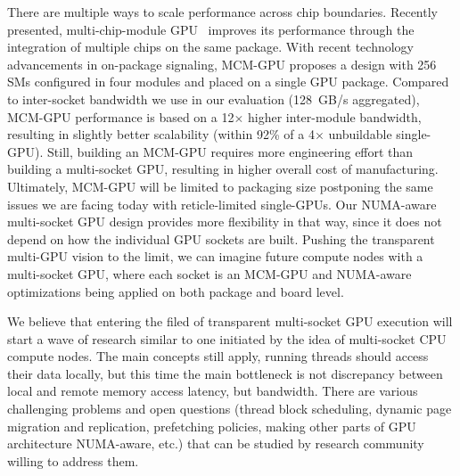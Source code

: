 \documentclass{sig-alternate}
\begin{document}
There are multiple ways to scale performance across chip boundaries. Recently presented, multi-chip-module GPU~\cite{Arunkumar2017} improves its performance through the integration of multiple chips on the same package. With recent technology advancements in on-package signaling, MCM-GPU proposes a design with 256 SMs configured in four modules and placed on a single GPU package. Compared to inter-socket bandwidth we use in our evaluation (\SI{128}{GB/s} aggregated), MCM-GPU performance is based on a 12$\times$ higher inter-module bandwidth, resulting in slightly better scalability (within 92\% of a 4$\times$ unbuildable single-GPU). Still, building an MCM-GPU requires more engineering effort than building a multi-socket GPU, resulting in higher overall cost of manufacturing. Ultimately, MCM-GPU will be limited to packaging size postponing the same issues we are facing today with reticle-limited single-GPUs. Our NUMA-aware multi-socket GPU design provides more flexibility in that way, since it does not depend on how the individual GPU sockets are built. Pushing the transparent multi-GPU vision to the limit, we can imagine future compute nodes with a multi-socket GPU, where each socket is an MCM-GPU and NUMA-aware optimizations being applied on both package and board level. 

We believe that entering the filed of transparent multi-socket GPU execution will start a wave of research similar to one initiated by the idea of multi-socket CPU compute nodes. The main concepts still apply, running threads should access their data locally, but this time the main bottleneck is not discrepancy between local and remote memory access latency, but bandwidth. There are various challenging problems and open questions (thread block scheduling, dynamic page migration and replication, prefetching policies, making other parts of GPU architecture NUMA-aware, etc.) that can be studied by research community willing to address them.



\end{document}
